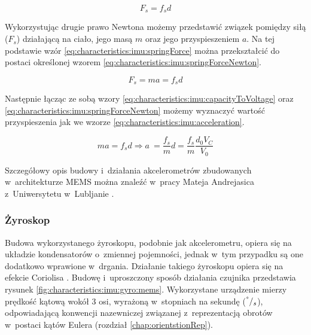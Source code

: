 \begin{equation}
	F_s = f_s d
	\label{eq:characteristics:imu:springForce}
\end{equation}	
																																												
Wykorzystując drugie prawo Newtona możemy przedstawić związek pomiędzy siłą ($F_s$) działającą na ciało, jego masą $m$ oraz jego przyspieszeniem $a$. Na tej podstawie wzór \ref{eq:characteristics:imu:springForce} można przekształcić do postaci określonej wzorem \ref{eq:characteristics:imu:springForceNewton}.
																																											
\begin{equation}
	F_s = ma = f_s d
	\label{eq:characteristics:imu:springForceNewton}
\end{equation}	
																																											
Następnie łącząc ze sobą wzory \ref{eq:characteristics:imu:capacityToVoltage} oraz \ref{eq:characteristics:imu:springForceNewton} możemy wyznaczyć wartość przyspieszenia jak we wzorze \ref{eq:characteristics:imu:acceleration}.
																																											
\begin{equation}
	ma = f_s d \Rightarrow a~= \frac{f_s}{m} d = \frac{f_s}{m} \frac{d_0 V_C}{V_0}
	\label{eq:characteristics:imu:acceleration}
\end{equation}
																																											
Szczegółowy opis budowy i~działania akcelerometrów zbudowanych w~architekturze MEMS można znaleźć w~pracy Mateja Andrejasica z~Uniwersytetu w~Lubljanie \cite{Andrejasic2008}.
																																											
\subsubsection*{Żyroskop}
Budowa wykorzystanego żyroskopu, podobnie jak akcelerometru, opiera się na układzie kondensatorów o~zmiennej pojemności, jednak w~tym przypadku są one dodatkowo wprawione w~drgania. Działanie takiego żyroskopu opiera się na efekcie Coriolisa . Budowę i~uproszczony sposób działania czujnika przedstawia rysunek \ref{fig:characteristics:imu:gyro:mems}. Wykorzystane urządzenie mierzy prędkość kątową wokół 3 osi, wyrażoną w~stopniach na sekundę ($^\degree/_s$), odpowiadającą konwencji nazewniczej związanej z~reprezentacją obrotów w~postaci kątów Eulera (rozdział \ref{chap:orientstionRep}). 
																																													
